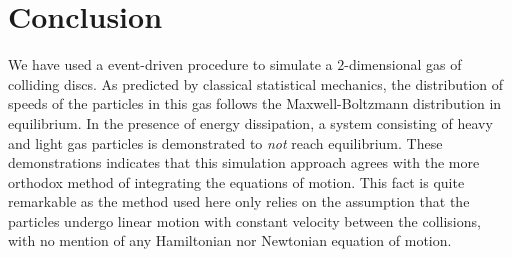 \part{Conclusion}

We have used a event-driven procedure to simulate a $2$-dimensional gas of colliding discs. As predicted by classical statistical mechanics, the distribution of speeds of the particles in this gas follows the Maxwell-Boltzmann distribution in equilibrium. In the presence of energy dissipation, a system consisting of heavy and light gas particles is demonstrated to \textit{not} reach equilibrium. These demonstrations indicates that this simulation approach agrees with the more orthodox method of integrating the equations of motion. This fact is quite remarkable as the method used here only relies on the assumption that the particles undergo linear motion with constant velocity between the collisions, with no mention of any Hamiltonian nor Newtonian equation of motion.
